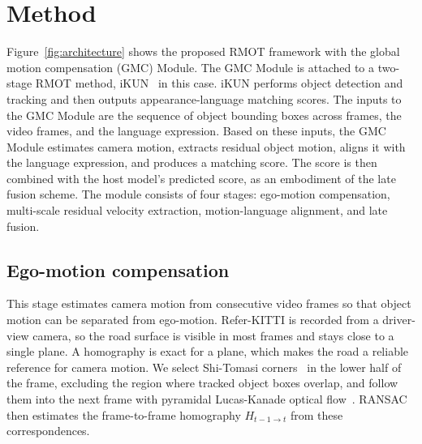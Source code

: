 \documentclass{article}
\begin{document}



\section{Method}
\label{sec:method}
Figure~\ref{fig:architecture} shows the proposed RMOT framework with the global motion compensation (GMC) Module. The GMC Module is attached to a two-stage RMOT method, iKUN~\cite{ikun} in this case. iKUN performs object detection and tracking and then outputs appearance-language matching scores. The inputs to the GMC Module are the sequence of object bounding boxes across frames, the video frames, and the language expression. Based on these inputs, the GMC Module estimates camera motion, extracts residual object motion, aligns it with the language expression, and produces a matching score. The score is then combined with the host model's predicted score, as an embodiment of the late fusion scheme. The module consists of four stages: ego-motion compensation, multi-scale residual velocity extraction, motion-language alignment, and late fusion.


\subsection{Ego-motion compensation}
\label{sec:ego}
This stage estimates camera motion from consecutive video frames so that object motion can be separated from ego-motion. Refer-KITTI is recorded from a driver-view camera, so the road surface is visible in most frames and stays close to a single plane. A homography is exact for a plane, which makes the road a reliable reference for camera motion. We select Shi-Tomasi corners~\cite{shitomasi} in the lower half of the frame, excluding the region where tracked object boxes overlap, and follow them into the next frame with pyramidal Lucas-Kanade optical flow~\cite{lucaskanade}. RANSAC~\cite{ransac} then estimates the frame-to-frame homography $H_{t-1 \to t}$ from these correspondences.
\end{document}

